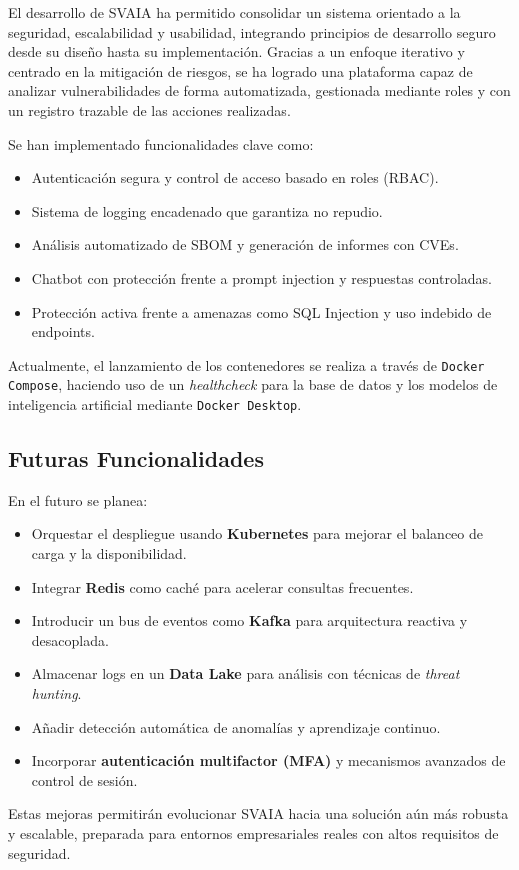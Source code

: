 \documentclass[11pt]{article}
\begin{document}
El desarrollo de SVAIA ha permitido consolidar un sistema orientado a la seguridad, escalabilidad y usabilidad, integrando principios de desarrollo seguro desde su diseño hasta su implementación. Gracias a un enfoque iterativo y centrado en la mitigación de riesgos, se ha logrado una plataforma capaz de analizar vulnerabilidades de forma automatizada, gestionada mediante roles y con un registro trazable de las acciones realizadas.

Se han implementado funcionalidades clave como:

\begin{itemize}
    \item Autenticación segura y control de acceso basado en roles (RBAC).
    \item Sistema de logging encadenado que garantiza no repudio.
    \item Análisis automatizado de SBOM y generación de informes con CVEs.
    \item Chatbot con protección frente a prompt injection y respuestas controladas.
    \item Protección activa frente a amenazas como SQL Injection y uso indebido de endpoints.
\end{itemize}

Actualmente, el lanzamiento de los contenedores se realiza a través de \texttt{Docker Compose}, haciendo uso de un \textit{healthcheck} para la base de datos y los modelos de inteligencia artificial mediante \texttt{Docker Desktop}.

\subsection*{Futuras Funcionalidades}

En el futuro se planea:

\begin{itemize}
    \item Orquestar el despliegue usando \textbf{Kubernetes} para mejorar el balanceo de carga y la disponibilidad.
    \item Integrar \textbf{Redis} como caché para acelerar consultas frecuentes.
    \item Introducir un bus de eventos como \textbf{Kafka} para arquitectura reactiva y desacoplada.
    \item Almacenar logs en un \textbf{Data Lake} para análisis con técnicas de \textit{threat hunting}.
    \item Añadir detección automática de anomalías y aprendizaje continuo.
    \item Incorporar \textbf{autenticación multifactor (MFA)} y mecanismos avanzados de control de sesión.
\end{itemize}

Estas mejoras permitirán evolucionar SVAIA hacia una solución aún más robusta y escalable, preparada para entornos empresariales reales con altos requisitos de seguridad.
\end{document}

